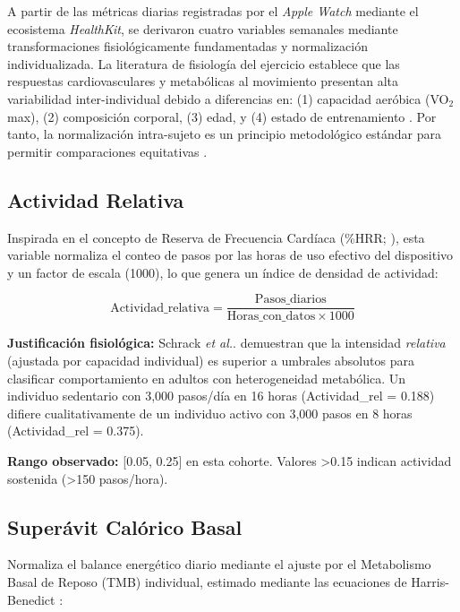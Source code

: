 A partir de las métricas diarias registradas por el \textit{Apple Watch} mediante el ecosistema \textit{HealthKit}, se derivaron cuatro variables semanales mediante transformaciones fisiológicamente fundamentadas y normalización individualizada. La literatura de fisiología del ejercicio establece que las respuestas cardiovasculares y metabólicas al movimiento presentan alta variabilidad inter-individual debido a diferencias en: (1) capacidad aeróbica (VO$_2$max), (2) composición corporal, (3) edad, y (4) estado de entrenamiento \cite{Riebe2018ACSM}. Por tanto, la normalización intra-sujeto es un principio metodológico estándar para permitir comparaciones equitativas \cite{Schrack2018,Ho2022}.

\subsection{Actividad Relativa}
\label{subsec:actividad_relativa}

Inspirada en el concepto de Reserva de Frecuencia Cardíaca (\%HRR; \cite{Schrack2018}), esta variable normaliza el conteo de pasos por las horas de uso efectivo del dispositivo y un factor de escala (1000), lo que genera un índice de densidad de actividad:

\begin{equation}
\text{Actividad\_relativa} = \frac{\text{Pasos\_diarios}}{\text{Horas\_con\_datos} \times 1000}
\label{eq:actividad_relativa}
\end{equation}

\textbf{Justificación fisiológica:} Schrack \textit{et al.}. \cite{Schrack2018} demuestran que la intensidad \textit{relativa} (ajustada por capacidad individual) es superior a umbrales absolutos para clasificar comportamiento en adultos con heterogeneidad metabólica. Un individuo sedentario con 3,000 pasos/día en 16 horas (Actividad\_rel = 0.188) difiere cualitativamente de un individuo activo con 3,000 pasos en 8 horas (Actividad\_rel = 0.375).

\textbf{Rango observado:} [0.05, 0.25] en esta cohorte. Valores >0.15 indican actividad sostenida (>150 pasos/hora).

\subsection{Superávit Calórico Basal}
\label{subsec:superavit_calorico}

Normaliza el balance energético diario mediante el ajuste por el Metabolismo Basal de Reposo (TMB) individual, estimado mediante las ecuaciones de Harris-Benedict \cite{Harris1918}:

